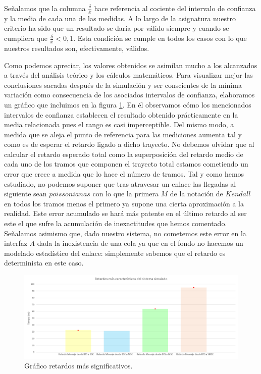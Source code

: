 \documentclass[10pt]{article}
\begin{document}
			Señalamos que la columna $\frac{\delta}{\bar{x}}$ hace referencia al cociente del intervalo de confianza y la media de cada una de las medidas. A lo largo de la asignatura nuestro criterio ha sido que un resultado se daría por válido siempre y cuando se cumpliera que $\frac{\delta}{\bar{x}} < 0,1$. Esta condición se cumple en todos los casos con lo que nuestros resultados son, efectivamente, válidos.

			Como podemos apreciar, los valores obtenidos se asimilan mucho a los alcanzados a través del análisis teórico y los cálculos matemáticos. Para visualizar mejor las conclusiones sacadas después de la simulación y ser conscientes de la mínima variación como consecuencia de los asociados intervalos de confianza, elaboramos un gráfico que incluimos en la figura \ref{f:graf_mess_del}. En él observamos cómo los mencionados intervalos de confianza establecen el resultado obtenido prácticamente en la media relacionada pues el rango es casi imperceptible. Del mismo modo, a medida que se aleja el punto de referencia para las mediciones aumenta tal y como es de esperar el retardo ligado a dicho trayecto. No debemos olvidar que al calcular el retardo esperado total como la superposición del retardo medio de cada uno de los tramos que componen el trayecto total estamos cometiendo un error que crece a medida que lo hace el número de tramos. Tal y como hemos estudiado, no podemos suponer que tras atravesar un enlace las llegadas al siguiente sean $poissonianas$ con lo que la primera $M$ de la notación de $Kendall$ en todos los tramos menos el primero ya supone una cierta aproximación a la realidad. Este error acumulado se hará más patente en el último retardo al ser este el que sufre la acumulación de inexactitudes que hemos comentado. Señalamos asimismo que, dado nuestro sistema, no cometemos este error en la interfaz $A$ dada la inexistencia de una cola ya que en el fondo no hacemos un modelado estadístico del enlace: simplemente sabemos que el retardo es determinista en este caso.

			\begin{figure}
					\centering
					\includegraphics[width=0.75\linewidth]{message_delays.png}
					\caption{Gráfico retardos más significativos.}
					\label{f:graf_mess_del}
			\end{figure}
\end{document}
